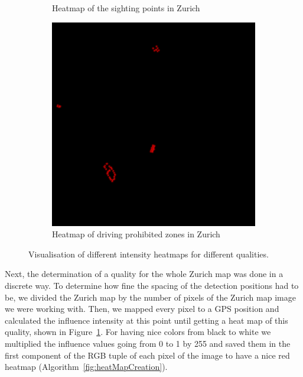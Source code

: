 \documentclass[letterpaper]{article}
\begin{document}
\begin{figure}[H]
\begin{subfigure}[t]{.45\columnwidth}
        \caption[width=.9\linewidth]{Heatmap of the sighting points in Zurich}
    \end{subfigure}\vspace{1mm}
    \begin{subfigure}[t]{.45\columnwidth}
        \centering
        \includegraphics[width=\linewidth]{images/results/driving_prohibited_heatmap_70.png}
        \caption[width=.9\linewidth]{Heatmap of driving prohibited zones in Zurich}
    \end{subfigure}\hspace{0.05\columnwidth}
    \caption{Visualisation of different intensity heatmaps for different qualities.}
    \label{fig:ZurichSingleHeatmaps}
\end{figure}

\indent Next, the determination of a quality for the whole Zurich map was done in a discrete way. To determine how fine the spacing of the detection positions had to be, we divided the Zurich map by the number of pixels of the Zurich map image we were working with. Then, we mapped every pixel to a GPS position and calculated the influence intensity at this point until getting a heat map of this quality, shown in Figure~\ref{fig:ZurichSingleHeatmaps}. For having nice colors from black to white we multiplied the influence values going from 0 to 1 by 255 and saved them in the first component of the RGB tuple of each pixel of the image to have a nice red heatmap (Algorithm~\ref{fig:heatMapCreation}).
\end{document}
